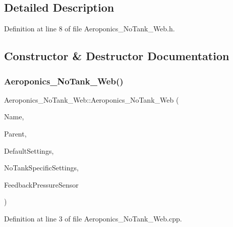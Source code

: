 \subsection{Detailed Description}


Definition at line 8 of file Aeroponics\+\_\+\+No\+Tank\+\_\+\+Web.\+h.



\subsection{Constructor \& Destructor Documentation}
\mbox{\label{class_aeroponics___no_tank___web_a5808702849b83477f93202b05b170e2b}} 
\subsubsection{\texorpdfstring{Aeroponics\+\_\+\+No\+Tank\+\_\+\+Web()}{Aeroponics\_NoTank\_Web()}}
{\footnotesize\ttfamily Aeroponics\+\_\+\+No\+Tank\+\_\+\+Web\+::\+Aeroponics\+\_\+\+No\+Tank\+\_\+\+Web (\begin{DoxyParamCaption}\item[{const \+\_\+\+\_\+\+Flash\+String\+Helper $\ast$}]{Name,  }\item[{\hyperlink{class_module___web}{Module\+\_\+\+Web} $\ast$}]{Parent,  }\item[{\hyperlink{struct_settings_1_1_aeroponics_settings}{Settings\+::\+Aeroponics\+Settings} $\ast$}]{Default\+Settings,  }\item[{\hyperlink{struct_settings_1_1_aeroponics_settings___no_tank_specific}{Settings\+::\+Aeroponics\+Settings\+\_\+\+No\+Tank\+Specific} $\ast$}]{No\+Tank\+Specific\+Settings,  }\item[{\hyperlink{class_pressure_sensor}{Pressure\+Sensor} $\ast$}]{Feedback\+Pressure\+Sensor }\end{DoxyParamCaption})}



Definition at line 3 of file Aeroponics\+\_\+\+No\+Tank\+\_\+\+Web.\+cpp.

